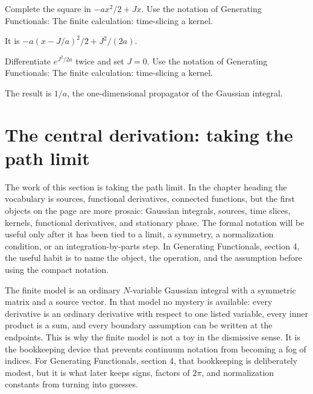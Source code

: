 \begin{exercise}
Complete the square in \(-ax^2/2+Jx\).  Use the notation of Generating Functionals: The finite calculation: time-slicing a kernel.
\begin{answer}
It is \(-a(x-J/a)^2/2+J^2/(2a)\).
\end{answer}
\end{exercise}

\begin{exercise}
Differentiate \(e^{J^2/2a}\) twice and set \(J=0\).  Use the notation of Generating Functionals: The finite calculation: time-slicing a kernel.
\begin{answer}
The result is \(1/a\), the one-dimensional propagator of the Gaussian integral.
\end{answer}
\end{exercise}



\section{The central derivation: taking the path limit}













The work of this section is taking the path limit.  In the chapter heading the vocabulary is sources, functional derivatives, connected functions, but the first objects on the page are more prosaic: Gaussian integrals, sources, time slices, kernels, functional derivatives, and stationary phase.  The formal notation will be useful only after it has been tied to a limit, a symmetry, a normalization condition, or an integration-by-parts step.  In Generating Functionals, section 4, the useful habit is to name the object, the operation, and the assumption before using the compact notation.

The finite model is an ordinary \(N\)-variable Gaussian integral with a symmetric matrix and a source vector.  In that model no mystery is available: every derivative is an ordinary derivative with respect to one listed variable, every inner product is a sum, and every boundary assumption can be written at the endpoints.  This is why the finite model is not a toy in the dismissive sense.  It is the bookkeeping device that prevents continuum notation from becoming a fog of indices.  For Generating Functionals, section 4, that bookkeeping is deliberately modest, but it is what later keeps signs, factors of \(2\pi\), and normalization constants from turning into guesses.

